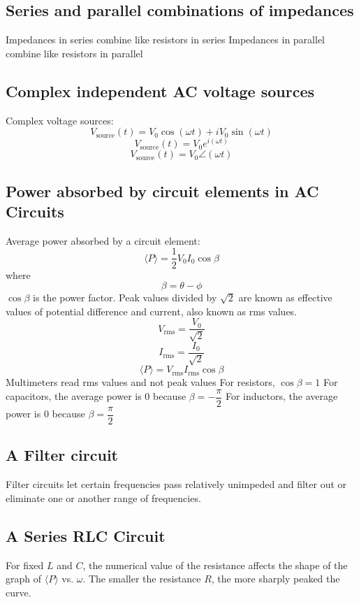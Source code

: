 \documentclass[twocolumn]{article}
\begin{document}
\subsection{Series and parallel combinations of impedances}
\begin{outline}
\1 Impedances in series combine like resistors in series
\1 Impedances in parallel combine like resistors in parallel
\end{outline}
\subsection{Complex independent AC voltage sources}
\begin{outline}
\1 Complex voltage sources: \[V_{\text{source}}(t)=V_0\cos(\omega t)+iV_0\sin(\omega t)\]\[V_{\text{source}}(t)=V_0e^{i(\omega t)}\]\[V_{\text{source}}(t)=V_0\angle(\omega t)\]
\end{outline}
\subsection{Power absorbed by circuit elements in AC Circuits}
\begin{outline}
\1 Average power absorbed by a circuit element: \[\langle P\rangle=\dfrac{1}{2}V_0I_0\cos\beta\]where\[\beta=\theta-\phi\]
\1 $\cos\beta$ is the power factor. 
\1 Peak values divided by $\sqrt 2$ are known as effective values of potential difference and current, also known as rms values. \[V_{\text{rms}}=\dfrac{V_0}{\sqrt 2}\]\[I_{\text{rms}}=\dfrac{I_0}{\sqrt 2}\]\[\langle P\rangle=V_{\text{rms}}I_{\text{rms}}\cos\beta\]
\1 Multimeters read rms values and not peak values
\1 For resistors, $\cos\beta=1$
\1 For capacitors, the average power is 0 because \(\beta=-\dfrac{\pi}{2}\)
\1 For inductors, the average power is 0 because \(\beta=\dfrac{\pi}{2}\)
\end{outline}
\subsection{A Filter circuit}
\begin{outline}
\1 Filter circuits let certain frequencies pass relatively unimpeded and filter out or eliminate one or another range of frequencies. 
\end{outline}
\subsection{A Series RLC Circuit}
\begin{outline}
\1 For fixed $L$ and $C$, the numerical value of the resistance affects the shape of the graph of $\langle P\rangle$ vs. $\omega$. The smaller the resistance $R$, the more sharply peaked the curve. 
\end{outline}
\end{document}
